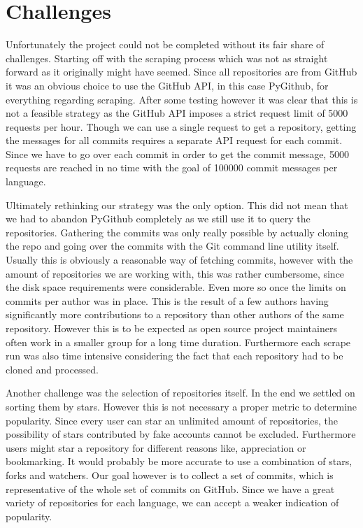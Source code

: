 \section{Challenges}
\label{sec:challenges}

Unfortunately the project could not be completed without its fair share of
challenges. Starting off with the scraping process which was not as straight
forward as it originally might have seemed. Since all repositories are from
GitHub it was an obvious choice to use the GitHub API, in this case PyGithub,
for everything regarding scraping. After some testing however it was clear that
this is not a feasible strategy as the GitHub API imposes a strict request
limit of 5000 requests per hour. Though we can use a single request to get a
repository, getting the messages for all commits requires a separate API
request for each commit. Since we have to go over each commit in
order to get the commit message, 5000 requests are reached in no time with the
goal of 100000 commit messages per language.

Ultimately rethinking our strategy was the only option. This did not mean that
we had to abandon PyGithub completely as we still use it to query the
repositories. Gathering the commits was only really possible by actually
cloning the repo and going over the commits with the Git command line utility
itself. Usually this is obviously a reasonable way of fetching commits, however
with the amount of repositories we are working with, this was rather cumbersome,
since the disk space requirements were considerable. Even more so once the
limits on commits per author was in place. This is the result of a few authors
having significantly more contributions to a repository than other authors of the
same repository. However this is to be expected as open source project
maintainers often work in a smaller group for a long time duration. Furthermore
each scrape run was also time intensive considering the fact that each
repository had to be cloned and processed.

Another challenge was the selection of repositories itself. In the end we settled
on sorting them by stars. However this is not necessary a proper metric to
determine popularity. Since every user can star an unlimited amount of
repositories, the possibility of stars contributed by fake accounts cannot be
excluded. Furthermore users might star a repository for different reasons like,
appreciation or bookmarking. It would probably be more accurate to use a
combination of stars, forks and watchers. Our goal however is to collect a set
of commits, which is representative of the whole set of commits on GitHub.
Since we have a great variety of repositories for each language, we can
accept a weaker indication of popularity.
